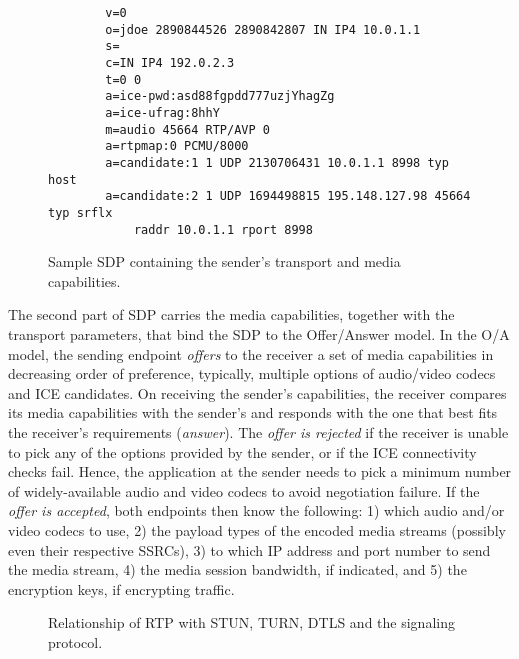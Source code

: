 
\begin{figure}[!h]
{\small
\begin{verbatim}
        v=0
        o=jdoe 2890844526 2890842807 IN IP4 10.0.1.1
        s=
        c=IN IP4 192.0.2.3
        t=0 0
        a=ice-pwd:asd88fgpdd777uzjYhagZg
        a=ice-ufrag:8hhY
        m=audio 45664 RTP/AVP 0
        a=rtpmap:0 PCMU/8000
        a=candidate:1 1 UDP 2130706431 10.0.1.1 8998 typ host
        a=candidate:2 1 UDP 1694498815 195.148.127.98 45664 typ srflx 
            raddr 10.0.1.1 rport 8998
\end{verbatim}
}
\caption{Sample SDP containing the sender's transport and media capabilities.}
\label{fig:3:sdp}
\end{figure}

The second part of SDP carries the media capabilities, together with the 
transport parameters, that bind the SDP to the Offer/Answer model. In the O/A
model, the sending endpoint \emph{offers} to the receiver a set of media
capabilities in decreasing order of preference, typically, multiple options of
audio/video codecs and ICE candidates. On receiving the sender's capabilities,
the receiver compares its media capabilities with the sender's and responds
with the one that best fits the receiver's requirements (\emph{answer}). The
\emph{offer is rejected} if the receiver is unable to pick any
of the options provided by the sender, or if the ICE connectivity checks fail.
Hence, the application at the sender needs to pick a minimum number of widely-available 
audio and video codecs to avoid negotiation failure. If the
\emph{offer is accepted}, both endpoints then know the following: 1) which
audio and/or video codecs to use, 2) the payload types of the encoded media
streams (possibly even their respective SSRCs), 3) to which IP address and
port number to send the media stream, 4) the media session bandwidth, if
indicated, and 5) the encryption keys, if encrypting traffic.

\begin{figure}
\caption{Relationship of RTP with STUN, TURN, DTLS and the signaling protocol.}
\label{fig:3:rtp-stack}
\end{figure}

